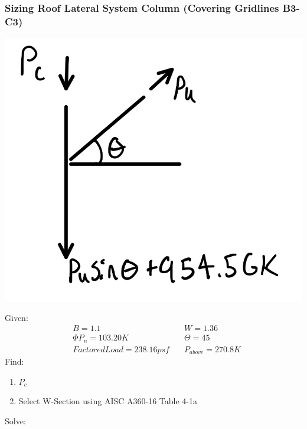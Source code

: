 \documentclass{report} %
\begin{document}
\subsubsection*{Sizing Roof Lateral System Column (Covering Gridlines B3-C3)}
\begin{center}
    \includegraphics[scale=0.15]{RoofLateralSystem_B3_C3_Loads}
\end{center}
Given:
\begin{equation*}
    \begin{aligned}
        &B = 1.1 &\quad W = 1.36 \\
        &\Phi P_n = 103.20K &\quad \Theta = 45 \\
        &Factored Load = 238.16psf &\quad P_{above} = 270.8K
    \end{aligned}
\end{equation*}
Find: 
\begin{enumerate}
    \item $P_c$
    \item Select W-Section using AISC A360-16 Table 4-1a
\end{enumerate}
Solve:
\end{document}
